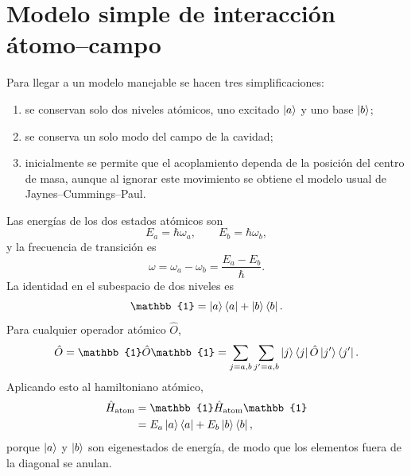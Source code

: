 \documentclass[11pt]{article}
\begin{document}
\section{Modelo simple de interacci\'on \'atomo--campo}

Para llegar a un modelo manejable se hacen tres simplificaciones:
\begin{enumerate}
  \item se conservan solo dos niveles at\'omicos, uno excitado \(\ket a\) y uno
  base \(\ket b\);
  \item se conserva un solo modo del campo de la cavidad;
  \item inicialmente se permite que el acoplamiento dependa de la posici\'on del
  centro de masa, aunque al ignorar este movimiento se obtiene el modelo usual
  de Jaynes--Cummings--Paul.
\end{enumerate}

Las energ\'ias de los dos estados at\'omicos son
\begin{equation}
  E_a=\hbar\omega_a,
  \qquad
  E_b=\hbar\omega_b,
\end{equation}
y la frecuencia de transici\'on es
\begin{equation}
  \omega=\omega_a-\omega_b
  =
  \frac{E_a-E_b}{\hbar}.
\end{equation}
La identidad en el subespacio de dos niveles es
\begin{equation}
  \mathbb{1}
  =
  \ket a\bra a+\ket b\bra b.
\end{equation}
Para cualquier operador at\'omico \(\hat O\),
\begin{equation}
  \hat O
  =
  \mathbb{1}\hat O\mathbb{1}
  =
  \sum_{j=a,b}\sum_{j'=a,b}
  \ket j
  \bra j\hat O\ket{j'}
  \bra{j'}.
\end{equation}
Aplicando esto al hamiltoniano at\'omico,
\begin{align}
  \hat H_{\mathrm{atom}}
  &=
  \mathbb{1}\hat H_{\mathrm{atom}}\mathbb{1}                                  \\
  &=
  E_a\ket a\bra a
  +
  E_b\ket b\bra b,
\end{align}
porque \(\ket a\) y \(\ket b\) son eigenestados de energ\'ia, de modo que los
elementos fuera de la diagonal se anulan.
\end{document}
